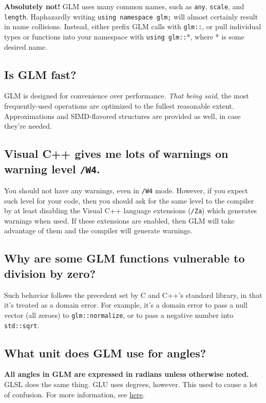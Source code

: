 \documentclass{scrartcl}
\numberwithin{figure}{subsection}
\begin{document}
\textbf{Absolutely not!}  GLM uses many common names, such as \verb|any|, \verb|scale|, and \verb|length|.  Haphazardly writing \verb|using namespace glm;| will almost certainly result in name collisions.  Instead, either prefix GLM calls with \verb|glm::|, or pull individual types or functions into your namespace with \verb|using glm::|*, where * is some desired name.

\subsection{Is GLM fast?}

GLM is designed for convenience over performance.  \emph{That being said}, the most frequently-used operations are optimized to the fullest reasonable extent.  Approximations and SIMD-flavored structures are provided as well, in case they're needed.

\subsection{Visual C++ gives me lots of warnings on warning level \texttt{/W4}.}

You should not have any warnings, even in \verb|/W4| mode. However, if you expect such level for your code, then you should ask for the same level to the compiler by at least disabling the Visual C++ language extensions (\verb|/Za|) which generates warnings when used. If these extensions are enabled, then GLM will take advantage of them and the compiler will generate warnings.

\subsection{Why are some GLM functions vulnerable to division by zero?}

Such behavior follows the precedent set by C and C++'s standard library, in that it's treated as a domain error. For example, it's a domain error to pass a null vector (all zeroes) to \verb|glm::normalize|, or to pass a negative number into \verb|std::sqrt|.

\subsection{What unit does GLM use for angles?}

\textbf{All angles in GLM are expressed in radians unless otherwise noted.}  GLSL does the same thing.  GLU uses degrees, however.  This used to cause a lot of confusion.  For more information, see \href{http://www.g-truc.net/post-0693.html#menu}{here}.
\end{document}
